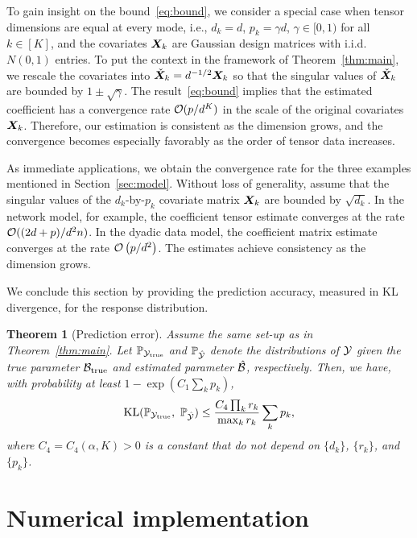 \documentclass{article}
\theoremstyle{plain}
\newtheorem{thm}{Theorem}[section]
\theoremstyle{definition}
\begin{document}
To gain insight on the bound~\eqref{eq:bound}, we consider a special case when tensor dimensions are equal at every mode, i.e., $d_k=d$, $p_k=\gamma d$, $\gamma\in [0,1)$ for all $k\in[K]$, and the covariates $\bm X_k$ are Gaussian design matrices with i.i.d.\ $N(0,1)$ entries. To put the context in the framework of Theorem~\ref{thm:main}, we rescale the covariates into $\check {\bm X}_k=d^{-1/2}\bm X_k$ so that the singular values of $\check {\bm X}_k$ are bounded by $1\pm \sqrt{\gamma}$. The result~\eqref{eq:bound} implies that the estimated coefficient has a convergence rate $\mathcal{O}(p/ d^K)$ in the scale of the original covariates $\bm X_k$. Therefore, our estimation is consistent as the dimension grows, and the convergence becomes especially favorably as the order of tensor data increases. 

As immediate applications, we obtain the convergence rate for the three examples mentioned in Section~\ref{sec:model}. Without loss of generality, assume that the singular values of the $d_k$-by-$p_k$ covariate matrix $\bm X_k$ are bounded by $\sqrt{d_k}$. In the network model, for example, the coefficient tensor estimate converges at the rate $\mathcal{O}({(2d+p) / d^2n})$. In the dyadic data model, the coefficient matrix estimate converges at the rate $\mathcal{O}\left({p/ d^2}\right)$.  The estimates achieve consistency as the dimension grows.  

We conclude this section by providing the prediction accuracy, measured in KL divergence, for the response distribution.   

\begin{thm}[Prediction error]\label{thm:KL}
Assume the same set-up as in Theorem~\ref{thm:main}. Let $\mathbb{P}_{\mathcal{Y}_{\text{true}}}$ and $\mathbb{P}_{\hat {\mathcal{Y}}}$ denote the distributions of $\mathcal{Y}$ given the true parameter $\mathcal{B}_{\text{true}}$ and estimated parameter $\hat {\mathcal{B}}$, respectively. Then, we have, with probability at least $1-\exp(C_1\sum_k p_k)$,
\begin{align*}
    \text{KL}(\mathbb{P}_{\mathcal{Y}_{\text{true}}},\ \mathbb{P}_{\hat {\mathcal{Y}}})\leq  \frac{ C_{4}\prod_kr_k}{\max_k r_k} \sum_k p_k,
\end{align*}
where $C_4=C_4(\alpha, K)>0$ is a constant that do not depend on $\{d_k\}$, $\{r_k\}$, and $\{p_k\}$.
\end{thm}
\vspace{-.1cm}

\section{Numerical implementation}
\vspace{-.1cm}
\end{document}
